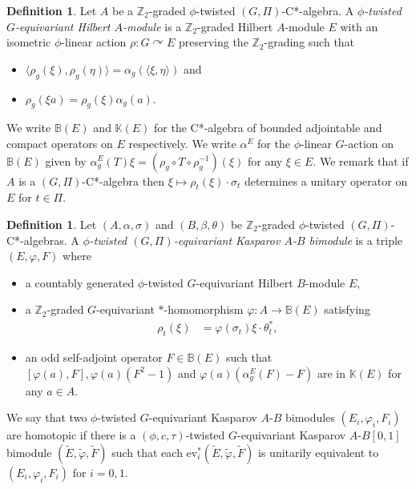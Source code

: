 \documentclass[11pt]{amsart}
\theoremstyle{definition}
\newtheorem{defn}[equation]{Definition}
\theoremstyle{plain}
\theoremstyle{remark}
\newcommand{\bB}{\mathbb{B}}
\newcommand{\bK}{\mathbb{K}}
\newcommand{\bZ}{\mathbb{Z}}
\newcommand{\ev}{\mathrm{ev}}
\begin{document}
\begin{defn}
Let $A$ be a $\bZ_2$-graded $\phi$-twisted $(G,\Pi)$-C*-algebra. A \emph{$\phi$-twisted $G$-equivariant Hilbert $A$-module} is a $\bZ_2$-graded Hilbert $A$-module $E$ with an isometric $\phi$-linear action $\rho \colon G \curvearrowright E$ preserving the $\bZ_2$-grading such that 
\begin{itemize}
\item $\langle \rho_g (\xi) , \rho_g (\eta) \rangle =\alpha _{g} (\langle \xi,\eta \rangle )$ and
\item $\rho_g(\xi a) = \rho_g(\xi) \alpha_g(a)$.
\end{itemize}
\end{defn}
We write $\bB(E)$ and $\bK(E)$ for the C*-algebra of bounded adjointable and compact operators on $E$ respectively. We write $\alpha^E$ for the $\phi$-linear $G$-action on $\bB(E)$ given by $\alpha^E_g(T)\xi=(\rho _g\circ T\circ \rho_g^{-1})(\xi)$ for any $\xi \in E$.
We remark that if $A$ is a $(G,\Pi)$-C*-algebra then $\xi\mapsto \rho_t(\xi) \cdot \sigma_t$ determines a unitary operator on $E$ for $t \in \Pi$. 


\begin{defn}
Let $(A, \alpha , \sigma)$ and $(B, \beta, \theta)$ be $\bZ_2$-graded $\phi$-twisted $(G,\Pi)$-C*-algebras. A \emph{$\phi$-twisted $(G,\Pi)$-equivariant Kasparov $A$-$B$ bimodule} is a triple $(E,\varphi,F)$ where
\begin{itemize}
\item a countably generated $\phi $-twisted $G$-equivariant Hilbert $B$-module $E$,
\item a $\bZ_2$-graded $G$-equivariant $\ast$-homomorphism $\varphi:A \to \bB (E)$ satisfying 
\begin{align*}
\rho_t(\xi) &=\varphi(\sigma_t) \xi \cdot \theta_t^* ,
\end{align*}
\item an odd self-adjoint operator $F \in \bB (E)$ such that $[\varphi(a),F], \varphi (a)(F^2-1)$ and $\varphi (a)(\alpha^E_g (F) -F)$ are in $\bK (E)$ for any $a \in A$.
\end{itemize}
\end{defn}



We say that two $\phi$-twisted $G$-equivariant Kasparov $A$-$B$ bimodules $(E_i,\varphi _i,F_i)$ are homotopic if there is a $(\phi , c,\tau)$-twisted $G$-equivariant Kasparov $A$-$B[0,1]$ bimodule $(\tilde{E},\tilde{\varphi},\tilde{F})$ such that each $\ev_i ^*(\tilde{E},\tilde{\varphi},\tilde{F})$ is unitarily equivalent to $(E_i,\varphi _i,F_i)$ for $i=0,1$.
\end{document}
